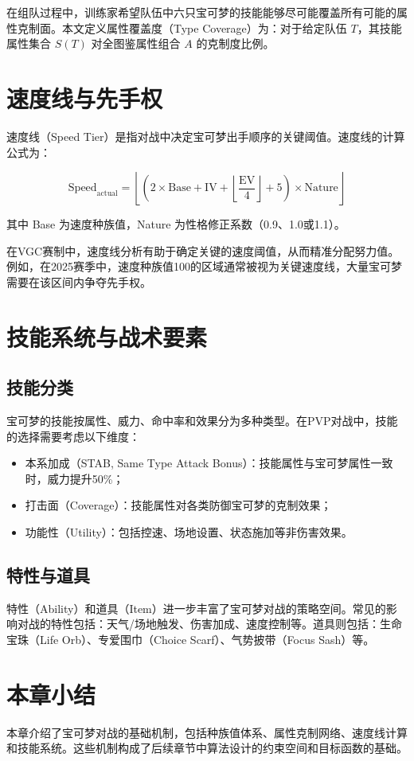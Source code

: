在组队过程中，训练家希望队伍中六只宝可梦的技能能够尽可能覆盖所有可能的属性克制面。本文定义属性覆盖度（Type Coverage）为：对于给定队伍 $T$，其技能属性集合 $S(T)$ 对全图鉴属性组合 $A$ 的克制度比例。

\section{速度线与先手权}

速度线（Speed Tier）是指对战中决定宝可梦出手顺序的关键阈值。速度线的计算公式为：

\begin{equation}\label{eq:speed}
    \text{Speed}_{\text{actual}} = \left\lfloor\left(2 \times \text{Base} + \text{IV} + \left\lfloor\frac{\text{EV}}{4}\right\rfloor + 5\right) \times \text{Nature}\right\rfloor
\end{equation}

其中 Base 为速度种族值，Nature 为性格修正系数（0.9、1.0或1.1）。

在VGC赛制中，速度线分析有助于确定关键的速度阈值，从而精准分配努力值。例如，在2025赛季中，速度种族值100的区域通常被视为关键速度线，大量宝可梦需要在该区间内争夺先手权。

\section{技能系统与战术要素}

\subsection{技能分类}

宝可梦的技能按属性、威力、命中率和效果分为多种类型。在PVP对战中，技能的选择需要考虑以下维度：

\begin{itemize}
    \item 本系加成（STAB, Same Type Attack Bonus）：技能属性与宝可梦属性一致时，威力提升50\%；
    \item 打击面（Coverage）：技能属性对各类防御宝可梦的克制效果；
    \item 功能性（Utility）：包括控速、场地设置、状态施加等非伤害效果。
\end{itemize}

\subsection{特性与道具}

特性（Ability）和道具（Item）进一步丰富了宝可梦对战的策略空间。常见的影响对战的特性包括：天气/场地触发、伤害加成、速度控制等。道具则包括：生命宝珠（Life Orb）、专爱围巾（Choice Scarf）、气势披带（Focus Sash）等。

\section{本章小结}

本章介绍了宝可梦对战的基础机制，包括种族值体系、属性克制网络、速度线计算和技能系统。这些机制构成了后续章节中算法设计的约束空间和目标函数的基础。
